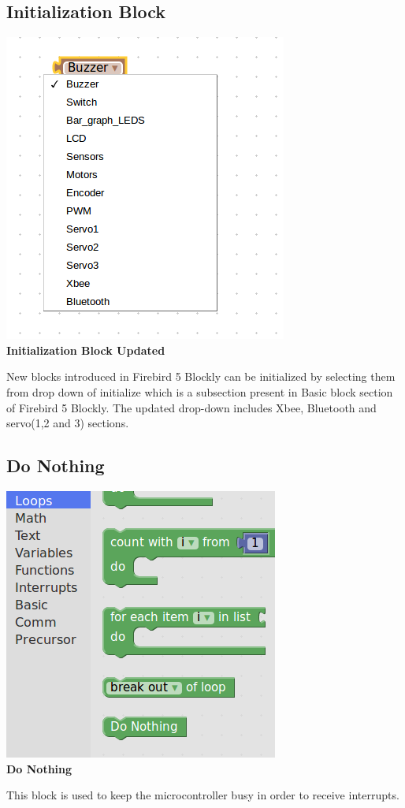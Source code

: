 \documentclass[a4paper,12pt,oneside]{book}
\begin{document}
\subsection{Initialization Block}    
    \begin{center}
    \includegraphics[scale =0.6]{initb}\\[.3in]
    \textbf{Initialization Block Updated}\\[1.3in]
    \end{center}
    New blocks introduced in Firebird 5 Blockly can be initialized by selecting them from drop down of initialize which is a subsection present in Basic block section of Firebird 5 Blockly. The updated drop-down includes Xbee, Bluetooth and servo(1,2 and 3) sections.
\newpage\subsection{Do Nothing}    
    \begin{center}
    \includegraphics[scale =0.6]{Dono}\\[.3in]
    \textbf{Do Nothing}\\[1.3in]
    \end{center}
    This block is used to keep the microcontroller busy in order to receive interrupts.
\end{document}
